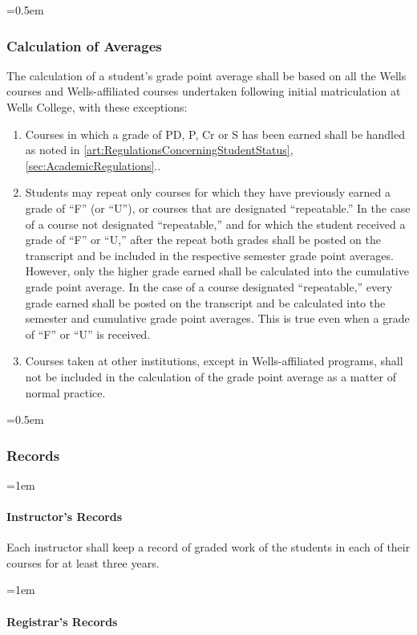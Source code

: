 \documentclass{manual}
\let\oldsubsubsection\subsubsection
\renewcommand\subsubsection{\leftskip=0.5em\oldsubsubsection}
\let\oldparagraph\paragraph
\renewcommand\paragraph{\leftskip=1em\oldparagraph}
\begin{document}
		\subsubsection{Calculation of Averages}

		The calculation of a student's grade point average shall be based on all the Wells courses and Wells-affiliated courses undertaken following  initial matriculation at Wells College, with these exceptions:

				\begin{enumerate}[label=\arabic*]
				\item Courses in which a grade of PD, P, Cr or S has been earned shall be handled as noted in \cref{art:RegulationsConcerningStudentStatus}, \cref{sec:AcademicRegulations}..
				\item Students may repeat only courses for which they have previously earned a grade  of ``F'' (or ``U''), or courses that are designated ``repeatable.'' In the case of a course not designated ``repeatable,'' and for which the student received a grade of ``F'' or ``U,'' after the repeat both grades shall be posted on the transcript and be included in the respective semester grade point averages. However, only the higher grade earned shall be calculated into the cumulative grade point average. In the case of a course designated ``repeatable,'' every grade earned shall be posted on the transcript and be calculated into the semester and cumulative grade point averages. This is true even when a grade of ``F'' or ``U'' is received.
				\item Courses taken at other institutions, except in Wells-affiliated programs, shall not be included in the calculation of the grade point average as a matter of normal practice.
				\end{enumerate}

		\subsubsection{Records}

			\paragraph{Instructor's Records}

			Each instructor shall keep a record of graded work of the students in each of their courses for at least three years.

			\paragraph{Registrar's Records}
\end{document}
